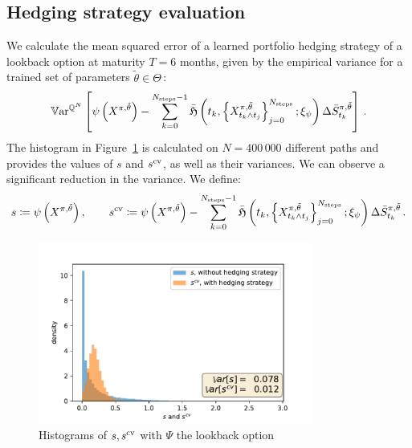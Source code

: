 \subsection{Hedging strategy evaluation}
We calculate the mean squared error of a learned portfolio hedging strategy of a lookback option at maturity $T=6$ months, given by the empirical variance for a trained set of parameters $\tilde{\theta}\in\Theta\,$:
\[
\mathbb{V}\mathrm{ar}^{\mathbb{Q}^N} \left[ \psi\left(X^{\pi,\tilde{\theta}}\right)-\sum_{k=0}^{N_{\text{steps}}-1} \bar{\mathfrak{H}}\left(t_k, \left\{X_{t_k\wedge t_j}^{\pi,\tilde{\theta}}\right\}_{j=0}^{N_{\text{steps}}}; \xi_{\psi}\right)\Delta \bar S^{\pi,\tilde{\theta}}_{t_{k}} \right] \,.
\]
The histogram in Figure~\ref{fig: SPX eval hedging strategy} is calculated on $N=400\, 000$ different paths and provides the values of $s$ and $s^{\textup{cv}}$, as well as their variances. We can observe a significant reduction in the variance. We define: 
\[
s\coloneqq\psi\left(X^{\pi,\tilde{\theta}}\right), \qquad
s^{\textup{cv}}\coloneqq \psi\left(X^{\pi,\tilde{\theta}}\right)-\sum_{k=0}^{N_{\text{steps}}-1} \bar{\mathfrak{H}}\left(t_k, \left\{X_{t_k\wedge t_j}^{\pi,\tilde{\theta}}\right\}_{j=0}^{N_{\text{steps}}}; \xi_{\psi}\right)\Delta \bar S^{\pi,\tilde{\theta}}_{t_{k}}\,.
\]
\vspace*{-\baselineskip}
\begin{figure}[htbp]\label{fig hedge error}
\centering
\includegraphics[clip,width=0.8\textwidth]{content/reschap1/Figures/figures_SPX/eval_hedging.pdf}
\caption{Histograms of $s, s^{\textup{cv}}$ with $\Psi$ the lookback option}	
\label{fig: SPX eval hedging strategy}
\end{figure}

